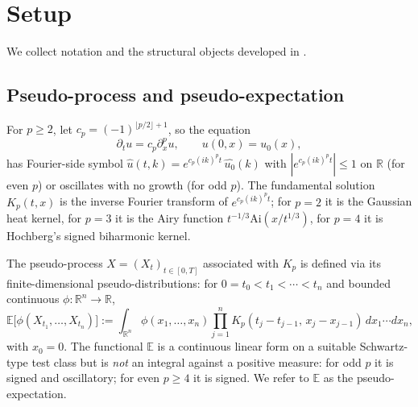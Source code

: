 \documentclass[11pt,reqno]{amsart}
\theoremstyle{plain}
\theoremstyle{definition}
\newcommand{\E}{\mathbb{E}}
\newcommand{\R}{\mathbb{R}}
\begin{document}
\section{Setup}
\label{sec:setup}

We collect notation and the structural objects developed in \cite{operatorDerivativeI, operatorDerivativeII}.

\subsection{Pseudo-process and pseudo-expectation}

For $p \geq 2$, let $c_p = (-1)^{\lfloor p/2 \rfloor + 1}$, so the equation
\begin{equation}
\partial_t u = c_p \partial_x^p u, \qquad u(0,x) = u_0(x),
\end{equation}
has Fourier-side symbol $\widehat{u}(t,k) = e^{c_p (ik)^p t}\, \widehat{u_0}(k)$ with $|e^{c_p (ik)^p t}| \leq 1$ on $\R$ (for even $p$) or oscillates with no growth (for odd $p$). The fundamental solution $K_p(t,x)$ is the inverse Fourier transform of $e^{c_p (ik)^p t}$; for $p=2$ it is the Gaussian heat kernel, for $p=3$ it is the Airy function $t^{-1/3} \mathrm{Ai}(x/t^{1/3})$, for $p=4$ it is Hochberg's signed biharmonic kernel.

The pseudo-process $X = (X_t)_{t \in [0,T]}$ associated with $K_p$ is defined via its finite-dimensional pseudo-distributions: for $0 = t_0 < t_1 < \cdots < t_n$ and bounded continuous $\phi: \R^n \to \R$,
\begin{equation}
\label{eq:pseudo-E}
\E\bigl[\phi(X_{t_1}, \ldots, X_{t_n})\bigr]
:= \int_{\R^n} \phi(x_1, \ldots, x_n) \prod_{j=1}^n K_p(t_j - t_{j-1},\, x_j - x_{j-1})\, dx_1 \cdots dx_n,
\end{equation}
with $x_0 = 0$. The functional $\E$ is a continuous linear form on a suitable Schwartz-type test class but is \emph{not} an integral against a positive measure: for odd $p$ it is signed and oscillatory; for even $p \geq 4$ it is signed. We refer to $\E$ as the pseudo-expectation.
\end{document}
